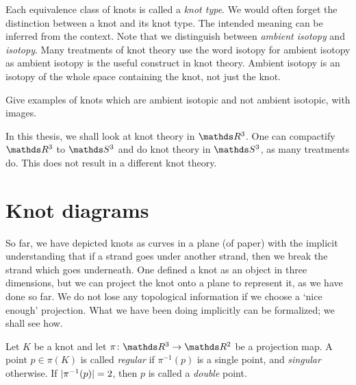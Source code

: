 Each equivalence class of knots is called a \textit{knot type}. We would often forget the distinction between a knot and its knot type. The intended meaning can be inferred from the context. Note that we distinguish between \textit{ambient isotopy} and \textit{isotopy}. Many treatments of knot theory use the word isotopy for ambient isotopy as ambient isotopy is the useful construct in knot theory. Ambient isotopy is an isotopy of the whole space containing the knot, not just the knot.

Give examples of knots which are ambient isotopic and not ambient isotopic, with images.

\begin{remark}
    In this thesis, we shall look at knot theory in \(\rthree\). One can compactify \(\rthree\) to \(\sthree\) and do knot theory in \(\sthree\), as many treatments do. This does not result in a different knot theory.
\end{remark}

\section{Knot diagrams}

So far, we have depicted knots as curves in a plane (of paper) with the implicit understanding that if a strand goes under another strand, then we break the strand which goes underneath. One defined a knot as an object in three dimensions, but we can project the knot onto a plane to represent it, as we have done so far. We do not lose any topological information if we choose a `nice enough' projection. What we have been doing implicitly can be formalized; we shall see how.

Let \(K\) be a knot and let \(\pi \colon \rthree \rightarrow \rtwo\) be a projection map. A point \(p \in \pi(K)\) is called \textit{regular} if \(\pi^{-1}(p)\) is a single point, and \textit{singular} otherwise. If \(\lvert\pi^{-1}(p)\rvert = 2\), then \(p\) is called a \textit{double} point.


%
%
%

%
%

